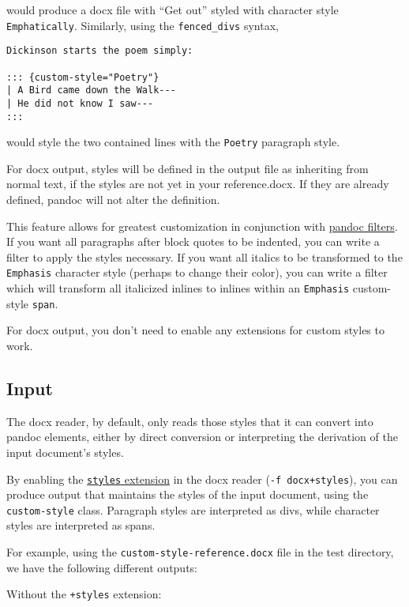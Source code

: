 \documentclass[
]{article}
\begin{document}
would produce a docx file with ``Get out'' styled with character style
\texttt{Emphatically}. Similarly, using the \texttt{fenced\_divs}
syntax,

\begin{verbatim}
Dickinson starts the poem simply:

::: {custom-style="Poetry"}
| A Bird came down the Walk---
| He did not know I saw---
:::
\end{verbatim}

would style the two contained lines with the \texttt{Poetry} paragraph
style.

For docx output, styles will be defined in the output file as inheriting
from normal text, if the styles are not yet in your reference.docx. If
they are already defined, pandoc will not alter the definition.

This feature allows for greatest customization in conjunction with
\href{https://pandoc.org/filters.html}{pandoc filters}. If you want all
paragraphs after block quotes to be indented, you can write a filter to
apply the styles necessary. If you want all italics to be transformed to
the \texttt{Emphasis} character style (perhaps to change their color),
you can write a filter which will transform all italicized inlines to
inlines within an \texttt{Emphasis} custom-style \texttt{span}.

For docx output, you don't need to enable any extensions for custom
styles to work.

\hypertarget{input}{%
\subsection{Input}\label{input}}

The docx reader, by default, only reads those styles that it can convert
into pandoc elements, either by direct conversion or interpreting the
derivation of the input document's styles.

By enabling the \protect\hyperlink{ext-styles}{\texttt{styles}
extension} in the docx reader (\texttt{-f\ docx+styles}), you can
produce output that maintains the styles of the input document, using
the \texttt{custom-style} class. Paragraph styles are interpreted as
divs, while character styles are interpreted as spans.

For example, using the \texttt{custom-style-reference.docx} file in the
test directory, we have the following different outputs:

Without the \texttt{+styles} extension:
\end{document}
